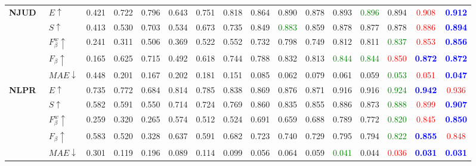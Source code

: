 \documentclass[runningheads]{llncs}
\begin{document}
\begin{table*}[tp]
{\begin{tabular}{lllccccccccccccc}
	\multirow{5}{*}{\textbf{NJUD}~\cite{3DACSD}}
&$E\uparrow$		&0.421	&0.722	&0.796	&0.643	&0.751	&0.818	&0.864	&0.890	&0.878	&0.893	&\textcolor{green}{0.896}	&0.894	&\textcolor{red}{0.908}	&\textbf{\textcolor{blue}{0.912}}\\
&$S\uparrow$	&0.413	&0.530	&0.703	&0.534	&0.673	&0.735	&0.849	&\textcolor{green}{0.883}	&0.859	&0.878	&0.877	&0.878	&\textcolor{red}{0.886}	&\textbf{\textcolor{blue}{0.894}}\\
&$F_{\beta}^w\uparrow$				&0.241	&0.311	&0.506	&0.369	&0.522	&0.552	&0.732	&0.798	&0.749	&0.812	&0.811	&\textcolor{green}{0.837}	&\textcolor{red}{0.853}	&\textbf{\textcolor{blue}{0.856}}\\
&$F_{\beta}\uparrow$	&0.165	&0.625	&0.715	&0.492	&0.618	&0.744	&0.788	&0.832	&0.813	&\textcolor{green}{0.844}	&\textcolor{green}{0.844}	&\textcolor{red}{0.850}	&\textbf{\textcolor{blue}{0.872}}	&\textbf{\textcolor{blue}{0.872}}\\
&$MAE\downarrow$		&0.448	&0.201	&0.167	&0.202	&0.181	&0.151	&0.085	&0.062	&0.079	&0.061	&0.059	&\textcolor{green}{0.053}	&\textcolor{red}{0.051}	&\textbf{\textcolor{blue}{0.047}}\\
										\cmidrule(r){1-16}
	\multirow{5}{*}{\textbf{NLPR}~\cite{3DNLPR}}
&$E\uparrow$		&0.735	&0.772	&0.684	&0.814	&0.785	&0.838	&0.869	&0.876	&0.871	&0.916	&0.916	&\textcolor{green}{0.924}	&\textbf{\textcolor{blue}{0.942}}	&\textcolor{red}{0.936}\\
&$S\uparrow$	&0.582	&0.591	&0.550	&0.714	&0.724	&0.769	&0.860	&0.835	&0.855	&0.886	&0.873	&\textcolor{green}{0.888}	&\textcolor{red}{0.899}	&\textbf{\textcolor{blue}{0.907}}\\
&$F_{\beta}^w\uparrow$			&0.259	&0.320	&0.265	&0.574	&0.512	&0.524	&0.691	&0.659	&0.688	&0.789	&0.772	&\textcolor{green}{0.820}	&\textcolor{red}{0.845}	&\textbf{\textcolor{blue}{0.850}}\\
&$F_{\beta}\uparrow$	&0.583	&0.520	&0.328	&0.637	&0.591	&0.682	&0.723	&0.740	&0.729	&0.795	&0.794	&\textcolor{green}{0.822}	&\textbf{\textcolor{blue}{0.855}}	&\textcolor{red}{0.848}\\
&$MAE\downarrow$		&0.301	&0.119	&0.196	&0.089	&0.114	&0.099	&0.056	&0.064	&0.059	&\textcolor{green}{0.041}	&0.044	&\textcolor{red}{0.036}	&\textbf{\textcolor{blue}{0.031}}	&\textbf{\textcolor{blue}{0.031}}	\\

									\cmidrule(r){1-16}
									

\end{tabular}}
\end{table*}
\end{document}

